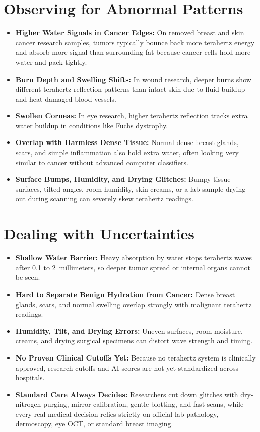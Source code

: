 \section{Observing for Abnormal Patterns}
\begin{itemize}
  \item \textbf{Higher Water Signals in Cancer Edges:} On removed breast and skin cancer research samples, tumors typically bounce back more terahertz energy and absorb more signal than surrounding fat because cancer cells hold more water and pack tightly.
  \item \textbf{Burn Depth and Swelling Shifts:} In wound research, deeper burns show different terahertz reflection patterns than intact skin due to fluid buildup and heat-damaged blood vessels.
  \item \textbf{Swollen Corneas:} In eye research, higher terahertz reflection tracks extra water buildup in conditions like Fuchs dystrophy.
  \item \textbf{Overlap with Harmless Dense Tissue:} Normal dense breast glands, scars, and simple inflammation also hold extra water, often looking very similar to cancer without advanced computer classifiers.
  \item \textbf{Surface Bumps, Humidity, and Drying Glitches:} Bumpy tissue surfaces, tilted angles, room humidity, skin creams, or a lab sample drying out during scanning can severely skew terahertz readings.
\end{itemize}

\section{Dealing with Uncertainties}
\begin{itemize}
  \item \textbf{Shallow Water Barrier:} Heavy absorption by water stops terahertz waves after 0.1 to 2~millimeters, so deeper tumor spread or internal organs cannot be seen.
  \item \textbf{Hard to Separate Benign Hydration from Cancer:} Dense breast glands, scars, and normal swelling overlap strongly with malignant terahertz readings.
  \item \textbf{Humidity, Tilt, and Drying Errors:} Uneven surfaces, room moisture, creams, and drying surgical specimens can distort wave strength and timing.
  \item \textbf{No Proven Clinical Cutoffs Yet:} Because no terahertz system is clinically approved, research cutoffs and AI scores are not yet standardized across hospitals.
  \item \textbf{Standard Care Always Decides:} Researchers cut down glitches with dry-nitrogen purging, mirror calibration, gentle blotting, and fast scans, while every real medical decision relies strictly on official lab pathology, dermoscopy, eye OCT, or standard breast imaging.
\end{itemize}

